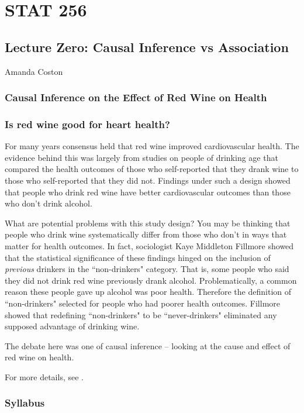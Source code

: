 \chapter{STAT 256}
\section{Lecture Zero: Causal Inference vs Association}{Amanda Coston}

\subsection{Causal Inference on the Effect of Red Wine on Health}\label{sec:intro}

\subsection{Is red wine good for heart health?}
For many years consensus held that red wine improved cardiovascular health. The evidence behind this was largely from studies on people of drinking age that compared the health outcomes of those who self-reported that they drank wine to those who self-reported that they did not. Findings under such a design showed that people who drink  red wine have better cardiovascular outcomes than those who don't drink alcohol.

What are potential problems with this study design? You may be thinking that people who drink wine systematically differ from those who don't in ways that matter for health outcomes. In fact, sociologist Kaye Middleton Fillmore showed that the statistical significance of these findings hinged on the inclusion of \emph{previous} drinkers in the ``non-drinkers" category. That is, some people who said they did not drink red wine previously drank alcohol. Problematically, a common reason these people gave up alcohol was poor health. Therefore the definition of  ``non-drinkers" selected for people who had poorer health outcomes. Fillmore showed that redefining ``non-drinkers" to be ``never-drinkers" eliminated any supposed advantage of drinking wine.

The debate here was one of causal inference -- looking at the cause and effect of red wine on health.

For more details, see \cite{fillmore2007moderate}.

\subsection{Syllabus}

